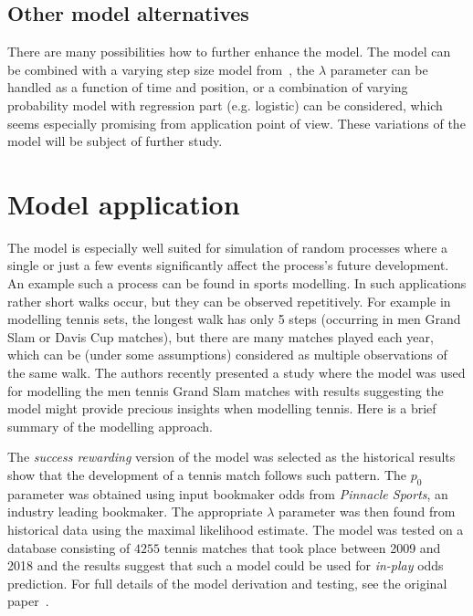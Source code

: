 \documentclass[runningheads]{CMSIM}
\begin{document}
    \subsection{Other model alternatives}\label{subsec:other-model-alternatives}

    There are many possibilities how to further enhance the model.
    The model can be combined with a varying step size model from~\cite{turban2010random},
    the $\lambda$ parameter can be handled as a function of time and position,
    or a combination of varying probability model with regression
    part (e.g. logistic) can be considered, which seems especially promising from application point of view.
    These variations of the model will be subject of further study.


    \section{Model application}\label{sec:Model-application}

    The model is especially well suited for simulation of random processes where a single or just a few events significantly affect the process's future development.
    An example such a process can be found in sports modelling.
    In such applications rather short walks occur, but they can be observed repetitively.
    For example in modelling tennis sets, the longest walk has only 5 steps (occurring in men Grand Slam or Davis Cup matches), but there are many matches played each year,
    which can be (under some assumptions) considered as multiple observations of the same walk.
    The authors recently presented a study where the model was used for modelling the men tennis Grand Slam matches with results suggesting the model might provide precious insights when modelling tennis.
    Here is a brief summary of the modelling approach.

    The \emph{success rewarding} version of the model was selected as the historical results show that the development of a tennis match follows such pattern.
    The $p_{0}$ parameter was obtained using input bookmaker odds from \emph{Pinnacle Sports}, an industry leading bookmaker.
    The appropriate $\lambda$ parameter was then found from historical data using the maximal likelihood estimate.
    The model was tested on a database consisting of $4255$ tennis matches that took place between 2009 and 2018 and the results suggest that such a model could be used for \emph{in-play} odds prediction.
    For full details of the model derivation and testing, see the original paper~\cite{ja2019mathsport_proc}.
\end{document}
